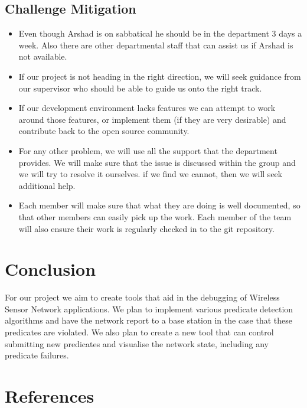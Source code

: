 \documentclass[a4paper]{article}
\begin{document}
\subsection{Challenge Mitigation}
\begin{itemize}
	\item Even though Arshad is on sabbatical he should be in the department 3 days a week. Also there are other departmental staff that can assist us if Arshad is not available.
	\item If our project is not heading in the right direction, we will seek guidance from our supervisor who should be able to guide us onto the right track.
	\item If our development environment lacks features we can attempt to work around those features, or implement them (if they are very desirable) and contribute back to the open source community.
	\item For any other problem, we will use all the support that the department provides. We will make sure that the issue is discussed within the group and we will try to resolve it ourselves. if we find we cannot, then we will seek additional help.
	\item Each member will make sure that what they are doing is well documented, so that other members can easily pick up the work. Each member of the team will also ensure their work is regularly checked in to the git repository.
\end{itemize}


\section{Conclusion}

For our project we aim to create tools that aid in the debugging of Wireless Sensor Network applications. We plan to implement various predicate detection algorithms and have the network report to a base station in the case that these predicates are violated. We also plan to create a new tool that can control submitting new predicates and visualise the network state, including any predicate failures.

\clearpage

\appendixpage
\addappheadtotoc
\appendix


\section{References}
\renewcommand{\refname}{\vspace{-1cm}}


\end{document}
